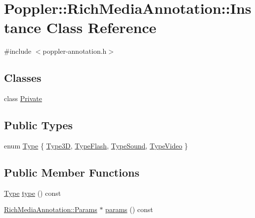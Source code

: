 \hypertarget{class_poppler_1_1_rich_media_annotation_1_1_instance}{}\section{Poppler\+:\+:Rich\+Media\+Annotation\+:\+:Instance Class Reference}
\label{class_poppler_1_1_rich_media_annotation_1_1_instance}


{\ttfamily \#include $<$poppler-\/annotation.\+h$>$}

\subsection*{Classes}
\begin{DoxyCompactItemize}
\item 
class \hyperlink{class_poppler_1_1_rich_media_annotation_1_1_instance_1_1_private}{Private}
\end{DoxyCompactItemize}
\subsection*{Public Types}
\begin{DoxyCompactItemize}
\item 
enum \hyperlink{class_poppler_1_1_rich_media_annotation_1_1_instance_ae1f530939f7bd947ac119b7315f5ec44}{Type} \{ \hyperlink{class_poppler_1_1_rich_media_annotation_1_1_instance_ae1f530939f7bd947ac119b7315f5ec44ab93886cd31cf6911a5e917907784e237}{Type3D}, 
\hyperlink{class_poppler_1_1_rich_media_annotation_1_1_instance_ae1f530939f7bd947ac119b7315f5ec44a46a84ac6d1eef5d0ee6cb824ac5e696b}{Type\+Flash}, 
\hyperlink{class_poppler_1_1_rich_media_annotation_1_1_instance_ae1f530939f7bd947ac119b7315f5ec44aa249dfde799d4e14a98c5a4bcc5681a0}{Type\+Sound}, 
\hyperlink{class_poppler_1_1_rich_media_annotation_1_1_instance_ae1f530939f7bd947ac119b7315f5ec44a36b691f64023c9f48103da1597631ca4}{Type\+Video}
 \}
\end{DoxyCompactItemize}
\subsection*{Public Member Functions}
\begin{DoxyCompactItemize}
\item 
\hyperlink{class_poppler_1_1_rich_media_annotation_1_1_instance_ae1f530939f7bd947ac119b7315f5ec44}{Type} \hyperlink{class_poppler_1_1_rich_media_annotation_1_1_instance_aa6958f1d141612cf71cda12edbcf27b0}{type} () const
\item 
\hyperlink{class_poppler_1_1_rich_media_annotation_1_1_params}{Rich\+Media\+Annotation\+::\+Params} $\ast$ \hyperlink{class_poppler_1_1_rich_media_annotation_1_1_instance_ada9518a7bc3d819c70e8739aa00b2922}{params} () const
\end{DoxyCompactItemize}
